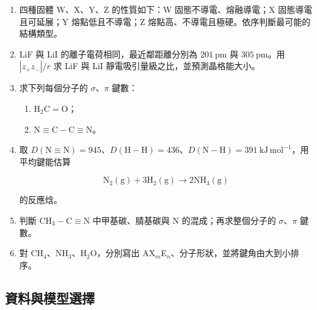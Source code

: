 \documentclass[11pt,a4paper]{article}
\providecommand{\tightlist}{%
  \setlength{\itemsep}{0pt}\setlength{\parskip}{0pt}}
\begin{document}
\begin{enumerate}
\def\labelenumi{\arabic{enumi}.}
\item
  四種固體 W、X、Y、Z 的性質如下：W 固態不導電、熔融導電；X 固態導電且可延展；Y 熔點低且不導電；Z 熔點高、不導電且極硬。依序判斷最可能的結構類型。
\item
  LiF 與 LiI 的離子電荷相同，最近鄰距離分別為 \(201\ \mathrm{pm}\) 與 \(305\ \mathrm{pm}\)。用 \(|z_+z_-|/r\) 求 LiF 與 LiI 靜電吸引量級之比，並預測晶格能大小。
\item
  求下列每個分子的 \(\sigma\)、\(\pi\) 鍵數：

  \begin{enumerate}
  \def\labelenumii{\arabic{enumii}.}
  \tightlist
  \item
    \(\mathrm{H_2C=O}\)；
  \item
    \(\mathrm{N\equiv C-C\equiv N}\)。
  \end{enumerate}
\item
  取 \(D(\mathrm{N\equiv N})=945\)、\(D(\mathrm{H-H})=436\)、\(D(\mathrm{N-H})=391\ \mathrm{kJ\,mol^{-1}}\)，用平均鍵能估算

  \[
  \mathrm{N_2(g)+3H_2(g)\rightarrow2NH_3(g)}
  \]

  的反應焓。
\item
  判斷 \(\mathrm{CH_3-C\equiv N}\) 中甲基碳、腈基碳與 N 的混成；再求整個分子的 \(\sigma\)、\(\pi\) 鍵數。
\item
  對 CH\(_4\)、NH\(_3\)、H\(_2\)O，分別寫出 AX\(_m\)E\(_n\)、分子形狀，並將鍵角由大到小排序。
\end{enumerate}

\subsection{資料與模型選擇}\label{ux8cc7ux6599ux8207ux6a21ux578bux9078ux64c7}
\end{document}
